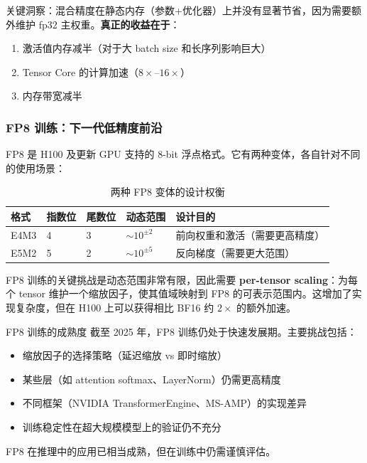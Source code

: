 关键洞察：混合精度在静态内存（参数+优化器）上并没有显著节省，因为需要额外维护 fp32 主权重。\textbf{真正的收益在于}：
\begin{enumerate}
    \item 激活值内存减半（对于大 batch size 和长序列影响巨大）
    \item Tensor Core 的计算加速（$8\times$--$16\times$）
    \item 内存带宽减半
\end{enumerate}

\subsubsection{FP8 训练：下一代低精度前沿}

FP8 是 H100 及更新 GPU 支持的 8-bit 浮点格式。它有两种变体，各自针对不同的使用场景：

\begin{table}[H]
\centering
\begin{tabular}{p{}p{}p{}p{}p{}}
\toprule
\textbf{格式} & \textbf{指数位} & \textbf{尾数位} & \textbf{动态范围} & \textbf{设计目的} \\
\midrule
E4M3 & 4 & 3 & $\sim 10^{\pm 2}$ & 前向权重和激活（需要更高精度） \\
E5M2 & 5 & 2 & $\sim 10^{\pm 5}$ & 反向梯度（需要更大范围） \\
\bottomrule
\end{tabular}
\caption{两种 FP8 变体的设计权衡}
\end{table}

FP8 训练的关键挑战是动态范围非常有限，因此需要 \textbf{per-tensor scaling}：为每个 tensor 维护一个缩放因子，使其值域映射到 FP8 的可表示范围内。这增加了实现复杂度，但在 H100 上可以获得相比 BF16 约 $2\times$ 的额外加速。

\begin{warningbox}{FP8 训练的成熟度}
截至 2025 年，FP8 训练仍处于快速发展期。主要挑战包括：
\begin{itemize}
    \item 缩放因子的选择策略（延迟缩放 vs 即时缩放）
    \item 某些层（如 attention softmax、LayerNorm）仍需更高精度
    \item 不同框架（NVIDIA TransformerEngine、MS-AMP）的实现差异
    \item 训练稳定性在超大规模模型上的验证仍不充分
\end{itemize}
FP8 在推理中的应用已相当成熟，但在训练中仍需谨慎评估。
\end{warningbox}

